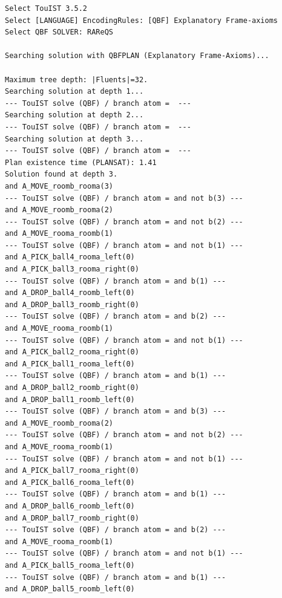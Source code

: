 \begin{scriptsize}
\begin{verbatim}
Select TouIST 3.5.2
Select [LANGUAGE] EncodingRules: [QBF] Explanatory Frame-axioms
Select QBF SOLVER: RAReQS

Searching solution with QBFPLAN (Explanatory Frame-Axioms)...

Maximum tree depth: |Fluents|=32.
Searching solution at depth 1...
--- TouIST solve (QBF) / branch atom =  ---
Searching solution at depth 2...
--- TouIST solve (QBF) / branch atom =  ---
Searching solution at depth 3...
--- TouIST solve (QBF) / branch atom =  ---
Plan existence time (PLANSAT): 1.41
Solution found at depth 3.
and A_MOVE_roomb_rooma(3)
--- TouIST solve (QBF) / branch atom = and not b(3) ---
and A_MOVE_roomb_rooma(2)
--- TouIST solve (QBF) / branch atom = and not b(2) ---
and A_MOVE_rooma_roomb(1)
--- TouIST solve (QBF) / branch atom = and not b(1) ---
and A_PICK_ball4_rooma_left(0)
and A_PICK_ball3_rooma_right(0)
--- TouIST solve (QBF) / branch atom = and b(1) ---
and A_DROP_ball4_roomb_left(0)
and A_DROP_ball3_roomb_right(0)
--- TouIST solve (QBF) / branch atom = and b(2) ---
and A_MOVE_rooma_roomb(1)
--- TouIST solve (QBF) / branch atom = and not b(1) ---
and A_PICK_ball2_rooma_right(0)
and A_PICK_ball1_rooma_left(0)
--- TouIST solve (QBF) / branch atom = and b(1) ---
and A_DROP_ball2_roomb_right(0)
and A_DROP_ball1_roomb_left(0)
--- TouIST solve (QBF) / branch atom = and b(3) ---
and A_MOVE_roomb_rooma(2)
--- TouIST solve (QBF) / branch atom = and not b(2) ---
and A_MOVE_rooma_roomb(1)
--- TouIST solve (QBF) / branch atom = and not b(1) ---
and A_PICK_ball7_rooma_right(0)
and A_PICK_ball6_rooma_left(0)
--- TouIST solve (QBF) / branch atom = and b(1) ---
and A_DROP_ball6_roomb_left(0)
and A_DROP_ball7_roomb_right(0)
--- TouIST solve (QBF) / branch atom = and b(2) ---
and A_MOVE_rooma_roomb(1)
--- TouIST solve (QBF) / branch atom = and not b(1) ---
and A_PICK_ball5_rooma_left(0)
--- TouIST solve (QBF) / branch atom = and b(1) ---
and A_DROP_ball5_roomb_left(0)
\end{verbatim}
\end{scriptsize}

